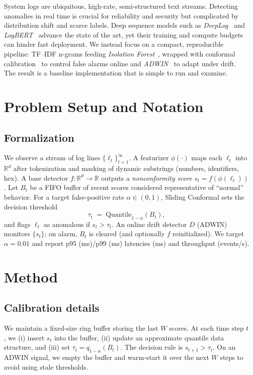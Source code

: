 \documentclass[10pt,twocolumn]{article}
\begin{document}
System logs are ubiquitous, high-rate, semi-structured text streams. Detecting anomalies in real time is crucial for reliability and security but complicated by distribution shift and scarce labels. Deep sequence models such as \emph{DeepLog}~\cite{du2017deeplog} and \emph{LogBERT}~\cite{guo2021logbert} advance the state of the art, yet their training and compute budgets can hinder fast deployment. We instead focus on a compact, reproducible pipeline: TF--IDF n-grams feeding \emph{Isolation Forest}~\cite{liu2008iforest}, wrapped with conformal calibration~\cite{vovk2005alrw,shafer2008tutorial} to control false alarms online and \emph{ADWIN}~\cite{bifet2007adwin} to adapt under drift. The result is a baseline implementation that is simple to run and examine.
\section{Problem Setup and Notation}
\subsection*{Formalization}
We observe a stream of log lines $\{\ell_t\}_{t=1}^{\infty}$. A featurizer $\phi(\cdot)$ maps each $\ell_t$ into $\mathbb{R}^d$ after tokenization and masking of dynamic substrings (numbers, identifiers, hex). A base detector $f:\mathbb{R}^d\!\to\!\mathbb{R}$ outputs a \emph{nonconformity score} $s_t=f(\phi(\ell_t))$. Let $B_t$ be a FIFO buffer of recent scores considered representative of ``normal'' behavior. For a target false-positive rate $\alpha\in(0,1)$, Sliding Conformal sets the decision threshold
\begin{equation}
\tau_t \;=\; \mathrm{Quantile}_{1-\alpha}(B_t),
\end{equation}
and flags $\ell_t$ as anomalous if $s_t>\tau_t$. An online drift detector $D$ (ADWIN) monitors $\{s_t\}$; on alarm, $B_t$ is cleared (and optionally $f$ reinitialized). We target $\alpha{=}0.01$ and report p95 (ms)/p99 (ms) latencies (ms) and throughput (events/s).

\section{Method}
\subsection*{Calibration details}

We maintain a fixed-size ring buffer storing the last $W$ scores. At each time step $t$, we (i) insert $s_t$ into the buffer, (ii) update an approximate quantile data structure, and (iii) set $\tau_t = q_{1-\alpha}(B_t)$. The decision rule is $s_{t+1} > \tau_t$. On an ADWIN signal, we empty the buffer and warm-start it over the next $W$ steps to avoid using stale thresholds.
\end{document}
